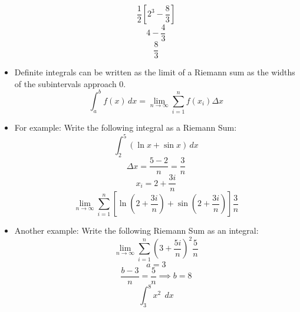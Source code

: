 \documentclass{article}
\begin{document}
\begin{itemize}
        \[\frac{1}{2}\left[2^3 - \frac{8}{3}\right]\]
        \[4-\frac{4}{3}\]
        \[\boxed{\frac{8}{3}}\]
    \item Definite integrals can be written as the limit of a Riemann sum as the widths of the subintervals approach 0.
        \[\int_a^b f(x)\,dx = \lim_{n\to\infty}\sum_{i=1}^n f(x_i) \Delta x\]
    \item For example: Write the following integral as a Riemann Sum:
        \[\int_2^5(\ln x+\sin x)\,dx\]
        \[\Delta x = \frac{5-2}{n} = \frac{3}{n}\]
        \[x_i = 2+\frac{3i}{n}\]
        \[\boxed{\lim_{n\to\infty}\sum_{i=1}^n \left[\ln\left(2+\frac{3i}{n}\right) + \sin\left(2+\frac{3i}{n}\right)\right]\frac{3}{n}}\]
    \item Another example: Write the following Riemann Sum as an integral:
        \[\lim_{n\to\infty}\sum_{i=1}^n\left(3+\frac{5i}{n}\right)^2\frac{5}{n}\]
        \[a = 3\]
        \[\frac{b-3}{n} = \frac{5}{n} \implies b = 8\]
        \[\boxed{\int_3^8 x^2\;\,dx}\]
\end{itemize}

\newpage
\end{document}
